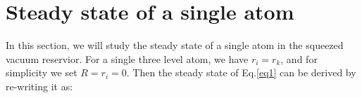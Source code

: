 \documentclass[aps,showpacs,twocolumn,twoside,groupedaddress]{revtex4}
\begin{document}
\section{Steady state of a single atom}
In this section, we will study the steady state of a single atom in the squeezed vacuum reservior. For a single three level atom, we have $r_i=r_k$, and for simplicity we set $R=r_i=0$. Then the steady state of Eq.\eqref{eq1} can be derived by re-writing it as:
\end{document}
